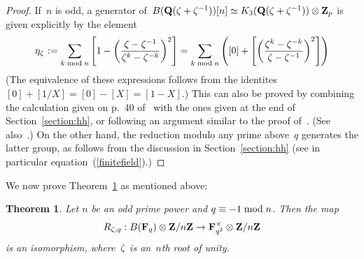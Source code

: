 \documentclass[12pt,reqno]{amsart}
\newtheorem{theorem}{Theorem}[section]
\theoremstyle{definition}
\newcommand{\changed}[1]{{#1}}
\def\be{\begin{equation}}
\def\ee{\end{equation}}
\def\mod{\;\text{\rm mod}\;}
\def\Q{\mathbf Q}   %
\def\Z{\mathbf Z}   %
\def\F{\mathbf F}   %
\def\nn{n}
\begin{document}
\begin{proof} \changed{If~$\nn$ is odd}, a generator of~$B(\Q(\z + \z^{-1}))[\nn] 
\simeq K_3(\Q(\z + \z^{-1})) \otimes \Z_p$ is given explicitly by 
the element 
\be
\label{eq.etaz}
\eta_\z  \ \changed{:=
 \sum_{k \mod n} \left[  1 - \left(\frac{\z-\z^{-1}}{\z^{k}-\z^{-k}}\right)^2 \right] 
 =
\sum_{k \mod n} \left([0] + 
 \left[ \left(
\frac{\z^{k} - \z^{-k}}{\z - \z^{-1}}  \right)^2 \right] \right)}
\ee
\changed{(The equivalence of these expressions follows
from the identites~$[0] + [1/X] = [0] - [X] = [1-X]$.) This can also be proved by combining the calculation given on p.~40 of~\cite{Zagier} with the
ones given at the end of Section~\ref{section:hh}, or following an argument similar 
to the proof  of~\cite[Theorem~1.4]{Zickert}. (See also~\cite[Proposition~5.4]{Frenkel}.)}
On the other hand, the reduction modulo any prime above~$q$ generates the latter group, as follows 
from the discussion in Section~\ref{section:hh} (\changed{see in particular equation~(\ref{finitefield}).)}
\end{proof}
 
We now prove Theorem~\ref{theorem:modpq} as mentioned above: 

\begin{theorem}
\label{theorem:modpq}
Let  \changed{$\nn$ be an odd} prime power and $q \equiv -1 \mod \nn$. Then the map
$$
R_{\z,q}: B(\F_q)  \otimes \Z/\nn \Z \rightarrow 
\F^{\times}_{q^2} \otimes \Z/\nn \Z
$$
is an isomorphism, where~$\zeta$ is an~$\nn$th root of unity.
\end{theorem}
\end{document}
